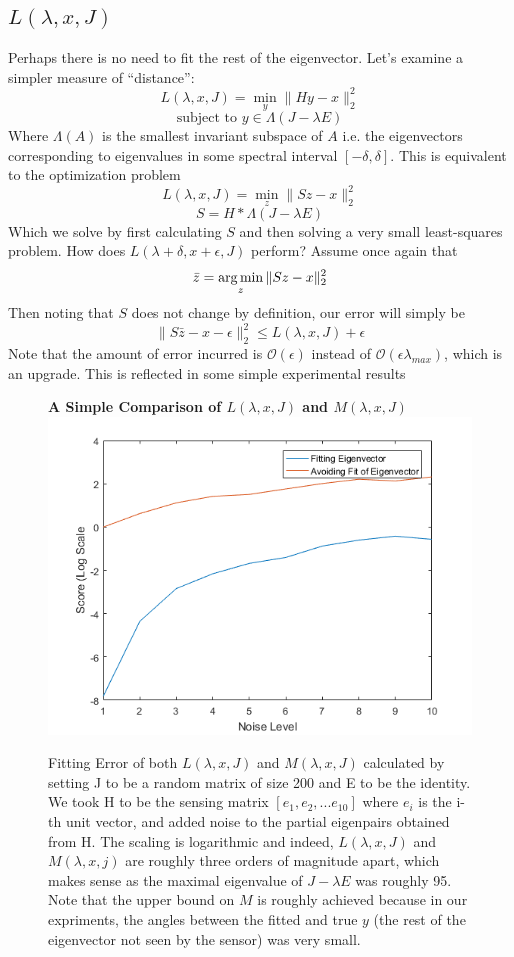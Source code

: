 \subsection{$L(\lambda, x, J)$}
Perhaps there is no need to fit the rest of the eigenvector. Let's examine a simpler measure of ``distance'':
\begin{equation}L(\lambda, x, J) = \min_y \|Hy - x\|_2^2 \end{equation}
$$\text{subject to } y \in \Lambda(J - \lambda E)$$
Where $\Lambda(A)$ is the smallest invariant subspace of $A$ i.e. the eigenvectors corresponding to eigenvalues in some spectral interval $[-\delta, \delta]$. This is equivalent to the optimization problem
$$L(\lambda, x, J) = \min_z \|Sz - x\|_2^2$$
$$ S = H*\Lambda(J - \lambda E)$$
Which we solve by first calculating $S$ and then solving a very small least-squares problem. How does $L(\lambda + \delta, x + \epsilon, J)$ perform? Assume once again that 
$$\bar{z} = \operatorname*{arg\,min} _z\|Sz - x\|_2^2$$
Then noting that $S$ does not change by definition, our error will simply be 
$$\|S\bar{z} - x - \epsilon\|_2^2 \leq L(\lambda, x, J) + \epsilon $$
Note that the amount of error incurred is $\mathcal{O}(\epsilon)$ instead of $\mathcal{O}(\epsilon \lambda_{max})$, which is an upgrade. This is reflected in some simple experimental results

\begin{figure}
\centering
\textbf{A Simple Comparison of $L(\lambda,x,J)$ and $M(\lambda,x,J)$}
\includegraphics[width=13cm]{Comparison1.png}
\caption{Fitting Error of both $L(\lambda,x,J)$ and $M(\lambda,x,J)$ calculated by setting J to be a random matrix of size 200 and E to be the identity. We took H to be the sensing matrix $[e_1, e_2, ... e_{10}]$ where $e_i$ is the i-th unit vector, and added noise to the partial eigenpairs obtained from H. The scaling is logarithmic and indeed, $L(\lambda,x,J)$ and $M(\lambda,x,j)$ are roughly three orders of magnitude apart, which makes sense as the maximal eigenvalue of $J - \lambda E$ was roughly 95. Note that the upper bound on $M$ is roughly achieved because in our expriments, the angles between the fitted and true $y$ (the rest of the eigenvector not seen by the sensor) was very small. }
\end{figure}


